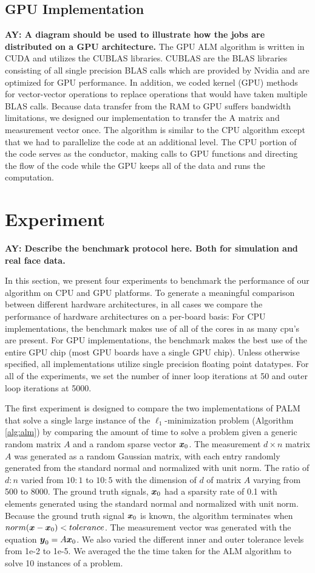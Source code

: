 \documentclass[10pt,twocolumn,letterpaper]{article}
\begin{document}
\subsection{GPU Implementation}
{\bf AY: A diagram should be used to illustrate how the jobs are distributed on a GPU architecture.}
The GPU ALM algorithm is written in CUDA and utilizes the CUBLAS libraries.
CUBLAS are the BLAS libraries consisting of all single precision BLAS calls
which are provided by Nvidia and are optimized for GPU performance. In
addition, we coded kernel (GPU) methods for vector-vector operations to replace
operations that would have taken multiple BLAS calls. Because data transfer from the 
RAM to GPU suffers bandwidth limitations, we designed our implementation to transfer the A matrix and measurement vector once.  
The algorithm is similar to the CPU algorithm except that we had to parallelize the code at an
additional level. The CPU portion of the code serves as the conductor, making
calls to GPU functions and directing the flow of the code while the GPU keeps all of the data and runs the computation.

\section{Experiment}
{\bf AY: Describe the benchmark protocol here. Both for simulation and real face data.}

In this section, we present four experiments to benchmark the performance of our algorithm on CPU and GPU platforms. 
To generate a meaningful comparison between different hardware architectures,
in all cases we compare the performance of hardware architectures on a
per-board basis:  For CPU implementations, the benchmark makes use of all of
the cores in as many cpu's are present.  For GPU implementations, the benchmark
makes the best use of the entire GPU chip (most GPU boards have a single GPU
chip).  Unless otherwise specified, all implementations utilize single
precision floating point datatypes.  For all of the experiments, we set the number 
of inner loop iterations at 50 and outer loop iterations at 5000.

The first experiment is designed to compare the two implementations of PALM
that solve a single large instance of the $\ell_1$-minimization problem (Algorithm \eqref{alg:alm}) by
comparing the amount of time to solve a problem given a generic random matrix $A$ and a random sparse
vector ${\boldsymbol{x}}_0$.  
The measurement $d \times n$ matrix $A$ was generated as a random Gaussian matrix, with each entry
randomly generated from the standard normal and normalized with unit norm.  The ratio of $d:n$ varied from
$10:1$ to $10:5$ with the dimension of $d$ of matrix $A$ varying from 500 to 8000.
The ground truth signals, ${\boldsymbol{x}}_0$ had a sparsity rate of 0.1 with elements generated using the standard normal and normalized with unit norm.
Because the ground truth signal ${\boldsymbol{x}}_0$ is known, the algorithm terminates
when $norm({\boldsymbol x}-{\boldsymbol x}_0) < tolerance$.
The measurement vector was generated with the equation $\boldsymbol{y}_0 = A {\boldsymbol{x}}_0$.   
We also varied the different inner and outer tolerance levels from 1e-2 to 1e-5.
We averaged the the time taken for the ALM algorithm to solve 10 instances of a problem.  
\end{document}

